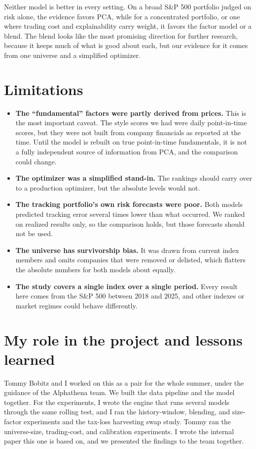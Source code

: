 \documentclass[11pt,letterpaper]{article}
\begin{document}
Neither model is better in every setting. On a broad S\&P 500 portfolio judged on risk
alone, the evidence favors PCA, while for a concentrated portfolio, or one where trading
cost and explainability carry weight, it favors the factor model or a blend. The blend looks like the
most promising direction for further research, because it keeps much of what is good about
each, but our evidence for it comes from one universe and a simplified optimizer.

\section{Limitations}

\begin{itemize}
\item \textbf{The ``fundamental'' factors were partly derived from prices.} This is the most
important caveat. The style scores we had were daily point-in-time scores, but they were not
built from company financials as reported at the time. Until the model is rebuilt on true
point-in-time fundamentals, it is not a fully independent source of information from PCA,
and the comparison could change.
\item \textbf{The optimizer was a simplified stand-in.} The rankings should carry over to a
production optimizer, but the absolute levels would not.
\item \textbf{The tracking portfolio's own risk forecasts were poor.} Both models predicted
tracking error several times lower than what occurred. We ranked on realized results only,
so the comparison holds, but those forecasts should not be used.
\item \textbf{The universe has survivorship bias.} It was drawn from current index members
and omits companies that were removed or delisted, which flatters the absolute numbers for
both models about equally.
\item \textbf{The study covers a single index over a single period.} Every result here comes
from the S\&P 500 between 2018 and 2025, and other indexes or market regimes could behave
differently.
\end{itemize}

\section{My role in the project and lessons learned}

Tommy Bobitz and I worked on this as a pair for the whole summer, under the guidance of the
Alphathena team. We built the data pipeline and the model together. For the experiments, I
wrote the engine that runs several models through the same rolling test, and I ran the
history-window, blending, and size-factor experiments and the tax-loss harvesting swap
study. Tommy ran the universe-size, trading-cost, and calibration experiments. I wrote the
internal paper this one is based on, and we presented the findings to the team together.
\end{document}

